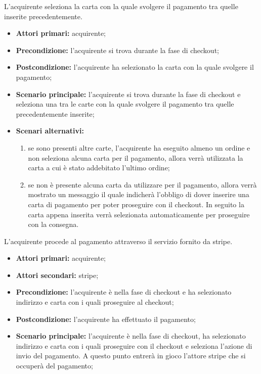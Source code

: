 L'acquirente seleziona la carta con la quale svolgere il pagamento tra quelle inserite precedentemente.
\begin{itemize}
    \item \textbf{Attori primari:} acquirente;
    \item \textbf{Precondizione:} l'acquirente si trova durante la fase di checkout;
    \item \textbf{Postcondizione:} l'acquirente ha selezionato la carta con la quale svolgere il pagamento;
    \item \textbf{Scenario principale:} l'acquirente si trova durante la fase di checkout e seleziona una tra le carte con la quale svolgere il pagamento tra quelle precedentemente inserite;
    \item \textbf{Scenari alternativi:}
    \begin{enumerate}[label=\lett]
        \item se sono presenti altre carte, l'acquirente ha eseguito almeno un ordine e non seleziona alcuna carta per il pagamento, allora verrà utilizzata la carta a cui è stato addebitato l'ultimo ordine;
        \item se non è presente alcuna carta da utilizzare per il pagamento, allora verrà mostrato un messaggio il quale indicherà l'obbligo di dover inserire una carta di pagamento per poter proseguire con il checkout. In seguito la carta appena inserita verrà selezionata automaticamente per proseguire con la consegna.
    \end{enumerate}
\end{itemize}

L'acquirente procede al pagamento attraverso il servizio fornito da stripe.
\begin{itemize}
    \item \textbf{Attori primari:} acquirente;
    \item \textbf{Attori secondari:} stripe;
    \item \textbf{Precondizione:} l'acquirente è nella fase di checkout e ha selezionato indirizzo e carta con i quali proseguire al checkout;
    \item \textbf{Postcondizione:} l'acquirente ha effettuato il pagamento;
    \item \textbf{Scenario principale:} l'acquirente è nella fase di checkout, ha selezionato indirizzo e carta con i quali proseguire con il checkout e seleziona l'azione di invio del pagamento. A questo punto entrerà in gioco l'attore stripe che si occuperà del pagamento;
\end{itemize}

